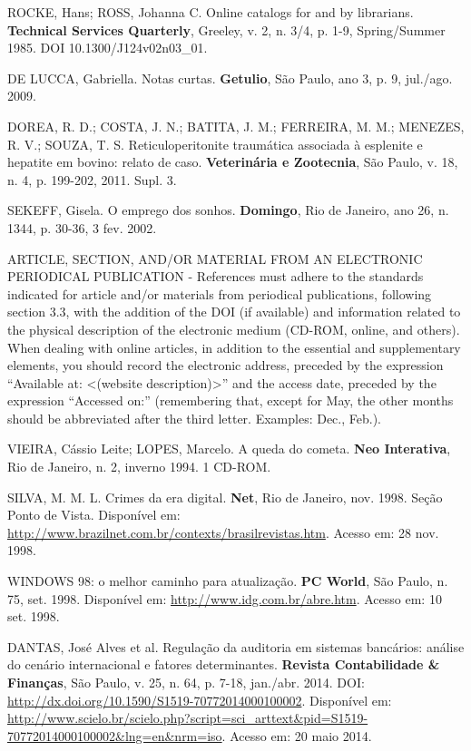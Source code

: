 \documentclass[revista,english,oneside]{ifes8}
\begin{document}
ROCKE, Hans; ROSS, Johanna C. Online catalogs for and by librarians. \textbf{Technical
Services Quarterly}, Greeley, v. 2, n. 3/4, p. 1-9, Spring/Summer 1985. DOI
10.1300/J124v02n03\_01.

DE LUCCA, Gabriella. Notas curtas. \textbf{Getulio}, São Paulo, ano 3, p. 9, jul./ago.
2009.

DOREA, R. D.; COSTA, J. N.; BATITA, J. M.; FERREIRA, M. M.; MENEZES, R. V.; SOUZA, T. S.
Reticuloperitonite traumática associada à esplenite e hepatite em bovino: relato de
caso. \textbf{Veterinária e Zootecnia}, São Paulo, v. 18, n. 4, p. 199-202, 2011. Supl.
3.

SEKEFF, Gisela. O emprego dos sonhos. \textbf{Domingo}, Rio de Janeiro, ano 26, n. 1344,
p. 30-36, 3 fev. 2002.

\vspace{4mm}
 ARTICLE, SECTION, AND/OR MATERIAL FROM AN ELECTRONIC PERIODICAL
PUBLICATION - References must adhere to the standards indicated for article and/or
materials from periodical publications, following section 3.3, with the addition
of the DOI (if available) and information related to the physical description of the
electronic medium (CD-ROM, online, and others). When dealing with online articles, in
addition to the essential and supplementary elements, you should record the electronic
address, preceded by the expression ``Available at: <(website description)>'' and the
access date, preceded by the expression ``Accessed on:'' (remembering that, except for
May, the other months should be abbreviated after the third letter. Examples: Dec.,
Feb.).

VIEIRA, Cássio Leite; LOPES, Marcelo. A queda do cometa. \textbf{Neo Interativa}, Rio de
Janeiro, n. 2, inverno 1994. 1 CD-ROM.

SILVA, M. M. L. Crimes da era digital. \textbf{Net}, Rio de Janeiro, nov. 1998. Seção
Ponto de Vista. Disponível em:
\url{http://www.brazilnet.com.br/contexts/brasilrevistas.htm}. Acesso em: 28 nov.
1998.

WINDOWS 98: o melhor caminho para atualização. \textbf{PC World}, São Paulo, n. 75, set.
1998. Disponível em: \url{http://www.idg.com.br/abre.htm}. Acesso em: 10 set. 1998.

DANTAS, José Alves et al. Regulação da auditoria em sistemas bancários: análise do
cenário internacional e fatores determinantes. \textbf{Revista Contabilidade \&
Finanças}, São Paulo, v. 25, n. 64, p. 7-18, jan./abr. 2014. DOI:
\url{http://dx.doi.org/10.1590/S1519-70772014000100002}. Disponível em:
\url{http://www.scielo.br/scielo.php?script=sci_arttext&pid=S1519-70772014000100002&lng=en&nrm=iso}.
Acesso em: 20 maio 2014.
\end{document}
